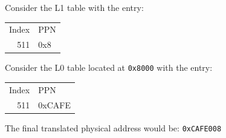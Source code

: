 \begin{slide}


    Consider the L1 table with the entry:

	\begin{center}
		{\ttfamily
		\begin{tabular}{rl}
		  Index & PPN \\
		  511   & 0x8 \\
		\end{tabular}}
		\end{center}
		\medskip

		Consider the L0 table located at \texttt{0x8000} with the entry:
		\begin{center}
		{\ttfamily
		\begin{tabular}{rl}
		  Index & PPN \\
		  511   & 0xCAFE \\
		\end{tabular}}
    \end{center}
    
    The final translated physical address would be: \texttt{0xCAFE008}

\end{slide}
  


